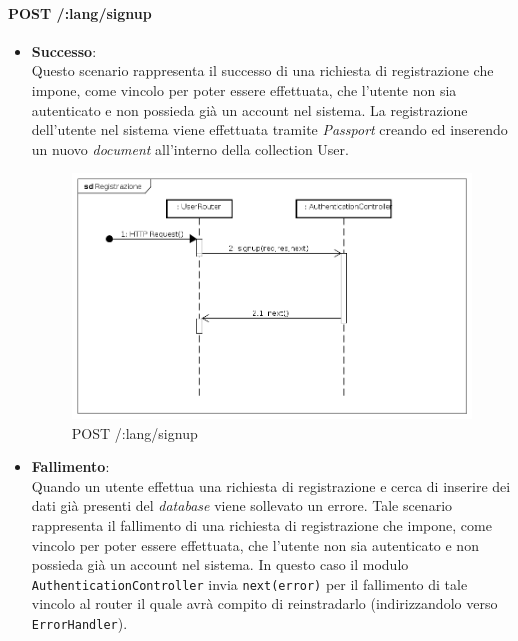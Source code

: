 \paragraph{POST /:lang/signup}
\begin{itemize}
\item \textbf{Successo}:\\
Questo scenario rappresenta il successo di una richiesta di registrazione che impone, come vincolo per poter essere effettuata, che l'utente non sia autenticato e non possieda già un account nel sistema. La registrazione dell'utente nel sistema viene effettuata tramite \textit{Passport} creando ed inserendo un nuovo \textit{document} all'interno della collection User.

\label{Procedura di registrazione}
\begin{figure}[ht]
	\centering
	\includegraphics[scale=0.40]{UML/DiagrammiDiSequenza/Back-end/POST__lang_signup_success.png}
	\caption{POST /:lang/signup}
\end{figure}
\FloatBarrier

\item \textbf{Fallimento}:\\
Quando un utente effettua una richiesta di registrazione e cerca di inserire dei dati già presenti del \textit{database} viene sollevato un errore. Tale scenario rappresenta il fallimento di una richiesta di registrazione che impone, come vincolo per poter essere effettuata, che l'utente non sia autenticato e non possieda già un account nel sistema. In questo caso il modulo \texttt{AuthenticationController} invia \texttt{next(error)} per il fallimento di tale vincolo al router il quale avrà compito di reinstradarlo (indirizzandolo verso \texttt{ErrorHandler}).


\end{itemize}
